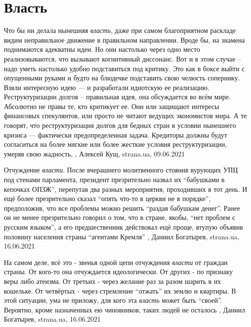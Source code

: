  
 
 
 
 
\chapter{Власть}
\label{sec:slova.vlast}

Что бы ни делала нынешняя \emph{власть}, даже при самом благоприятном раскладе
видим неправильное движение в правильном направлении.  Вроде бы, на знамена
поднимаются адекватны идеи. Но они настолько через одно место реализовываются,
что вызывают когнитивный диссонанс.  Вот и в этом случае – надо уметь настолько
удобно подставиться под критику.  Это как в боксе выйти с опущенными руками и
будто на блюдечке подставить свою челюсть сопернику. Взяли интересную идею — и
разработали идиотскую ее реализацию.  Реструктуризации долгов – правильная
идея, она обсуждается во всём мире. Абсолютно не правы те, кто критикует ее.
Они или защищают интересы финансовых спекулянтов, или просто не читают ведущих
экономистов мира. А те говорят, что реструктуризация долгов для бедных стран в
условии нынешнего кризиса — фактически предопределенная задача. Кредиторы
должны будут согласиться на более мягкие или более жесткие условия
реструктуризации, умеряв свою жадность,
, Алексей Кущ, strana.ua, 09.06.2021


Отчуждение \emph{власти}. После вчерашнего молитвенного стояния вурующих УПЦ
под стенами парламента, президент презрительно назвал их \enquote{бабушками в
кепочках ОПЗЖ}, перепутав два разных мероприятия, проходивших в тот день. И ещё
более презрительно сказал \enquote{опять что-то в церкви не в порядке},
предположив, что все проблемы можно решить \enquote{раздав бабушкам денег}.
Ранее он не менее презрительно говорил о том, что в стране, якобы, \enquote{нет
проблем с русским языком}, а его предшественник действовал ещё проще, втупую
объявив половину населения страны \enquote{агентами Кремля}
, 
Даниил Богатырев, strana.ua, 16.06.2021

На самом деле, всё это - звенья одной цепи отчуждения \emph{власти} от граждан
страны.  От кого-то она отчуждается идеологически. От других - по признаку веры
либо атеизма. От третьих - через желание раз за разом шарить в их кошельке. От
четвёртых - через стремление \enquote{отжать} их землю и квартиры.  В этой
ситуации, ума не приложу, для кого эта \emph{власть} может быть
\enquote{своей}. Вероятно, кроме назначенных ею чиновников, таких людей не
осталось
, 
Даниил Богатырев, strana.ua, 16.06.2021

